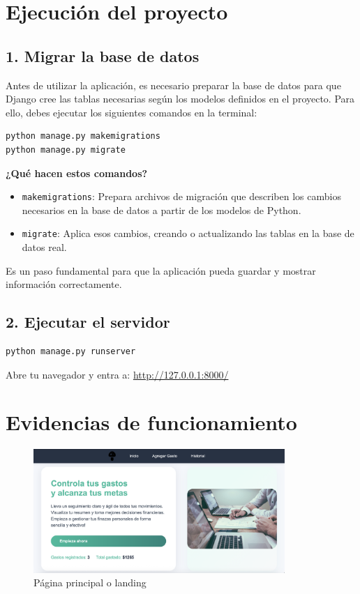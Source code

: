 \documentclass[12pt,a4paper]{article}
\begin{document}
\section{Ejecución del proyecto}

\subsection{1. Migrar la base de datos}

Antes de utilizar la aplicación, es necesario preparar la base de datos para que Django cree las tablas necesarias según los modelos definidos en el proyecto. Para ello, debes ejecutar los siguientes comandos en la terminal:

\begin{lstlisting}[language=bash]
python manage.py makemigrations
python manage.py migrate
\end{lstlisting}

\textbf{¿Qué hacen estos comandos?}

\begin{itemize}
    \item \texttt{makemigrations}: Prepara archivos de migración que describen los cambios necesarios en la base de datos a partir de los modelos de Python.
    \item \texttt{migrate}: Aplica esos cambios, creando o actualizando las tablas en la base de datos real.
\end{itemize}

Es un paso fundamental para que la aplicación pueda guardar y mostrar información correctamente.

\subsection{2. Ejecutar el servidor}

\begin{lstlisting}[language=bash]
python manage.py runserver
\end{lstlisting}

Abre tu navegador y entra a: \url{http://127.0.0.1:8000/}

\section{Evidencias de funcionamiento}

\begin{figure}[H]
    \centering
    \includegraphics[width=0.85\textwidth]{Pagina Principal.png}
    \caption{Página principal o landing}
\end{figure}
    
\end{document}
